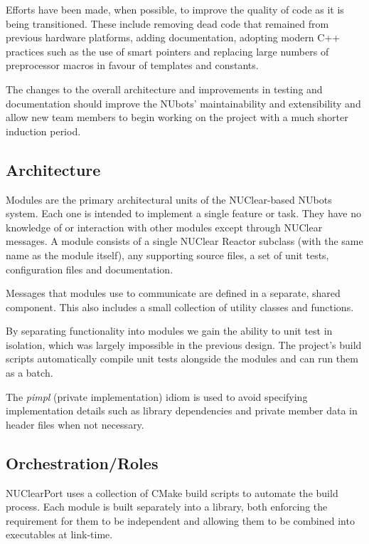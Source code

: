 \documentclass[english,12pt]{scrartcl}
\begin{document}
		Efforts have been made, when possible, to improve the quality of code as it is being
		transitioned. These include removing dead code that remained from previous hardware
		platforms, adding documentation, adopting modern C++ practices such as the use of smart
		pointers and replacing large numbers of preprocessor macros in favour of templates and
		constants.

		The changes to the overall architecture and improvements in testing and documentation
		should improve the NUbots' maintainability and extensibility and allow new team members
		to begin working on the project with a much shorter induction period.


		\subsection{Architecture}
			Modules are the primary architectural units of the NUClear-based NUbots system. Each
			one is intended to implement a single feature or task. They have no knowledge of or
			interaction with other modules except through NUClear messages. A module consists of
			a single NUClear Reactor subclass (with the same name as the module itself), any
			supporting source files, a set of unit tests, configuration files and documentation.

			Messages that modules use to communicate are defined in a separate, shared component.
			This also includes a small collection of utility classes and functions.

			By separating functionality into modules we gain the ability to unit test in isolation,
			which was largely impossible in the previous design. The project's build scripts
			automatically compile unit tests alongside the modules and can run them as a batch.

			The \emph{pimpl} (private implementation) idiom is used to avoid specifying
			implementation details such as library dependencies and private member data in header
			files when not necessary.


		\subsection{Orchestration/Roles}
			NUClearPort uses a collection of CMake build scripts to automate the build process.
			Each module is built separately into a library, both enforcing the requirement for
			them to be independent and allowing them to be combined into executables at
			link-time.
\end{document}
